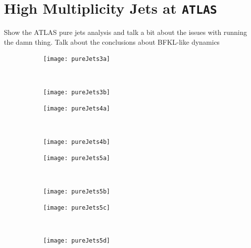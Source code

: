\chapter{High Multiplicity Jets at \texttt{ATLAS}}
\label{chap:ATLAS}

	Show the ATLAS pure jets analysis and talk a bit about the issues with running the damn thing.  Talk about the conclusions about BFKL-like dynamics

	\begin{figure}[H]
		\centering
		\begin{subfigure}[b]{0.48\textwidth}
		  \texttt{[image: pureJets3a]}
		  \caption{}
		  \label{fig:}
		\end{subfigure}
		~
		\begin{subfigure}[b]{0.48\textwidth}
		  \texttt{[image: pureJets3b]}
		  \caption{}
		  \label{fig:}
		\end{subfigure}
		\caption{}
		\label{fig:}
	\end{figure}

	\begin{figure}[H]
		\centering
		\begin{subfigure}[b]{0.48\textwidth}
		  \texttt{[image: pureJets4a]}
		  \caption{}
		  \label{fig:}
		\end{subfigure}
		~
		\begin{subfigure}[b]{0.48\textwidth}
		  \texttt{[image: pureJets4b]}
		  \caption{}
		  \label{fig:}
		\end{subfigure}
		\caption{}
		\label{fig:}
	\end{figure}

	\begin{figure}[H]
		\centering
		\begin{subfigure}[b]{0.48\textwidth}
		  \texttt{[image: pureJets5a]}
		  \caption{}
		  \label{fig:}
		\end{subfigure}
		~
		\begin{subfigure}[b]{0.48\textwidth}
		  \texttt{[image: pureJets5b]}
		  \caption{}
		  \label{fig:}
		\end{subfigure}
		\caption{}
		\label{fig:}
	\end{figure}

	\begin{figure}[H]
		\centering
		\begin{subfigure}[b]{0.48\textwidth}
		  \texttt{[image: pureJets5c]}
		  \caption{}
		  \label{fig:}
		\end{subfigure}
		~
		\begin{subfigure}[b]{0.48\textwidth}
		  \texttt{[image: pureJets5d]}
		  \caption{}
		  \label{fig:}
		\end{subfigure}
		\caption{}
		\label{fig:}
	\end{figure}

